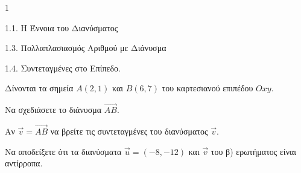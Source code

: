 \begin{ylh}{1}
    \item 1.1. Η Έννοια του Διανύσματος
    \item 1.3. Πολλαπλασιασμός Αριθμού με Διάνυσμα
    \item 1.4. Συντεταγμένες στο Επίπεδο.
\end{ylh}
Δίνονται τα σημεία $A(2,1)$ και $B(6,7)$ του καρτεσιανού επιπέδου $Oxy$.
\begin{alist}
\item Να σχεδιάσετε το διάνυσμα $\vec{AB}$. 
\item Αν $\vec{v} = \vec{AB}$ να βρείτε τις συντεταγμένες του διανύσματος $\vec{v}$. 
\item Να αποδείξετε ότι τα διανύσματα $\vec{u} = (-8,-12)$ και $\vec{v}$ του β) ερωτήματος είναι αντίρροπα. 
\end{alist}